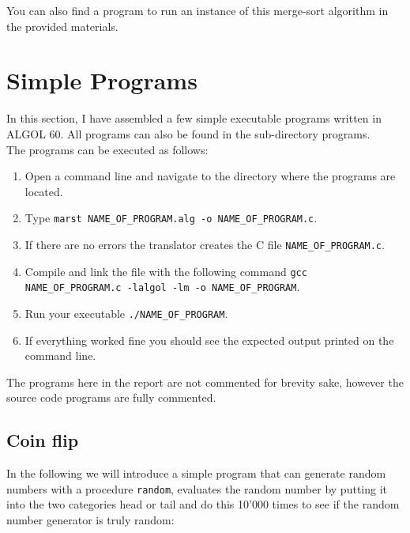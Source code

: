 \documentclass{article}
\begin{document}
You can also find a program to run an instance of this merge-sort algorithm in the provided materials.

\newpage

\section{Simple Programs} \label{simpleProg}
In this section, I have assembled a few simple executable programs written in ALGOL 60. All programs can also be found in the sub-directory programs.\\

The programs can be executed as follows:\\

\begin{enumerate}
	\item Open a command line and navigate to the directory where the programs are located.
	\item Type \texttt{marst NAME\_OF\_PROGRAM.alg -o NAME\_OF\_PROGRAM.c}.
	\item If there are no errors the translator creates the C file \texttt{NAME\_OF\_PROGRAM.c}.
	\item Compile and link the file with the following command \texttt{gcc NAME\_OF\_PROGRAM.c -lalgol -lm -o NAME\_OF\_PROGRAM}.
	\item Run your executable \texttt{./NAME\_OF\_PROGRAM}.
	\item If everything worked fine you should see the expected output printed on the command line.
\end{enumerate}

The programs here in the report are not commented for brevity sake, however the source code programs are fully commented.\\

\subsection{Coin flip}
In the following we will introduce a simple program that can generate random numbers with a procedure \texttt{random}, evaluates the random number by putting it into the two categories head or tail and do this 10'000 times to see if the random number generator is truly random:
\end{document}
